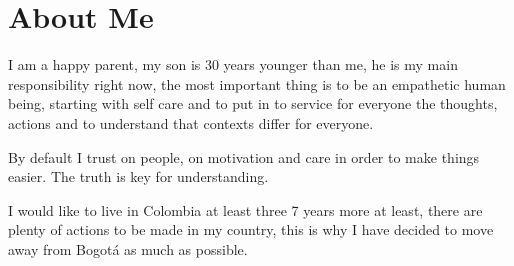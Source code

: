 \section{About Me}

I am a happy parent, my son is 30 years younger than me, he is
my main responsibility right now, the most important thing is
to be an empathetic human being, starting with self care and
to put in to service for everyone the thoughts, actions and
to understand that contexts differ for everyone.

By default I trust on people, on motivation and care in order
to make things easier.  The truth is key for understanding.

I would like to live in Colombia at least three 7 years more
at least, there are plenty of actions to be made in my 
country, this is why I have decided to move away from Bogotá
as much as possible.
 